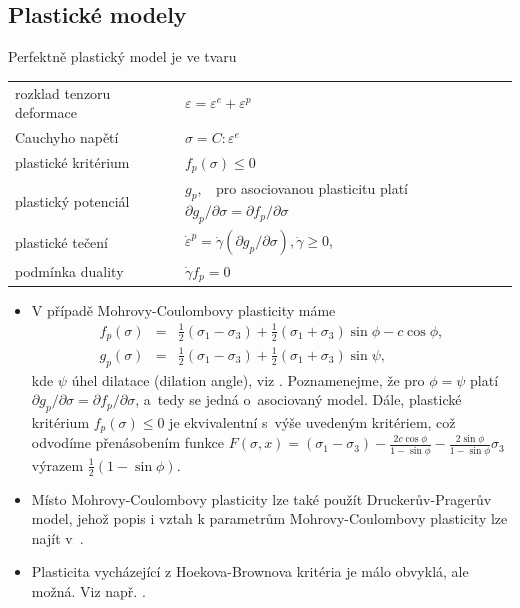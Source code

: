 \documentclass{article}
\newcommand{\alert}[1]{{\color{red}#1}}
\begin{document}
\subsection{Plastické modely}
\alert{Perfektně} plastický model je ve tvaru
\begin{table}[ht]
	\centering
	\begin{tabular}{ll}
		\hline
		rozklad tenzoru deformace & $\varepsilon = \varepsilon^e + \varepsilon^p$\\
		Cauchyho napětí & $\sigma = C : \varepsilon^e$\\
		\alert{plastické kritérium} & \alert{$f_p(\sigma)\leq0$}\\
		plastický potenciál & $g_p,\;\;$ \alert{pro asociovanou plasticitu platí} $\partial g_p/\partial \sigma = \partial f_p/\partial \sigma$  \\
		plastické tečení & \alert{$\dot{\varepsilon}^p = \dot{\gamma}(\partial g_p/\partial \sigma), \dot\gamma \geq 0$,}\\
		podmínka duality & $\dot{\gamma} f_p =0$\\
		\hline
	\end{tabular}
\end{table}

\begin{itemize}
	\item V případě Mohrovy-Coulombovy plasticity máme
	\begin{eqnarray*}
		f_p(\sigma) &=& \frac{1}{2} (\sigma_1 - \sigma_3) + \frac{1}{2} (\sigma_1 + \sigma_3)\sin \phi - c \cos \phi, \\
		g_p(\sigma) &=& \frac{1}{2} (\sigma_1 - \sigma_3) + \frac{1}{2} (\sigma_1 + \sigma_3)\sin \psi,
	\end{eqnarray*}
	\alert{kde $\psi$ úhel dilatace (dilation angle), viz \cite{Neto2011}. Poznamenejme, že pro $\phi = \psi$ platí $\partial g_p/\partial \sigma = \partial f_p/\partial \sigma$, a~tedy se jedná o~asociovaný model. Dále, plastické kritérium $f_p(\sigma)\leq0$ je ekvivalentní s~výše uvedeným kritériem, což odvodíme přenásobením funkce
	$F(\sigma, x) = (\sigma_1 - \sigma_3) - \frac{2c\cos \phi}{1-\sin \phi} - \frac{2\sin \phi}{1-\sin \phi} \sigma_3$ výrazem $\frac{1}{2}(1 - \sin \phi)$.}
	\item Místo Mohrovy-Coulombovy plasticity lze také použít Druckerův-Pragerův model, jehož popis i vztah k parametrům Mohrovy-Coulombovy plasticity lze najít v~\cite{Neto2011}. 
	\item Plasticita vycházející z Hoekova-Brownova kritéria je málo obvyklá, ale možná. Viz např. \cite{Carranza-Torres1999}.
\end{itemize}
\end{document}
